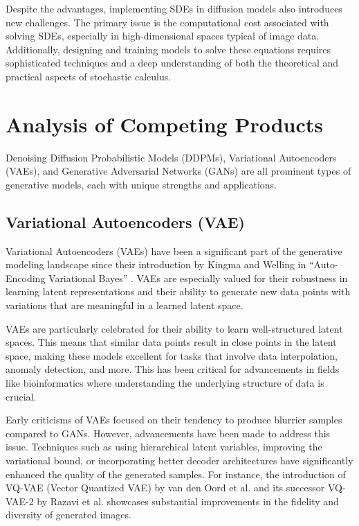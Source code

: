 Despite the advantages, implementing SDEs in diffusion models also introduces new challenges. The
primary issue is the computational cost associated with solving SDEs, especially in high-dimensional
spaces typical of image data. Additionally, designing and training models to solve these equations
requires sophisticated techniques and a deep understanding of both the theoretical and practical
aspects of stochastic calculus.

\section{Analysis of Competing Products}

Denoising Diffusion Probabilistic Models (DDPMs), Variational Autoencoders (VAEs), and Generative
Adversarial Networks (GANs) are all prominent types of generative models, each with unique strengths
and applications.

\subsection{Variational Autoencoders (VAE)}
\label{sec:vae}

Variational Autoencoders (VAEs) have been a significant part of the generative modeling landscape
since their introduction by Kingma and Welling in ``Auto-Encoding Variational Bayes''
\parencite{arXiv:1312.6114}. VAEs are especially valued for their robustness in learning latent
representations and their ability to generate new data points with variations that are meaningful in
a learned latent space.

VAEs are particularly celebrated for their ability to learn well-structured latent spaces. This
means that similar data points result in close points in the latent space, making these models
excellent for tasks that involve data interpolation, anomaly detection, and more. This has been
critical for advancements in fields like bioinformatics where understanding the underlying structure
of data is crucial.

Early criticisms of VAEs focused on their tendency to produce blurrier samples compared to GANs.
However, advancements have been made to address this issue. Techniques such as using hierarchical
latent variables, improving the variational bound, or incorporating better decoder architectures
have significantly enhanced the quality of the generated samples. For instance, the introduction of
VQ-VAE (Vector Quantized VAE) by van den Oord et al. \parencite{arXiv:1711.00937} and its successor
VQ-VAE-2 by Razavi et al. \parencite{arXiv:1906.00446} showcases substantial improvements in the
fidelity and diversity of generated images.

